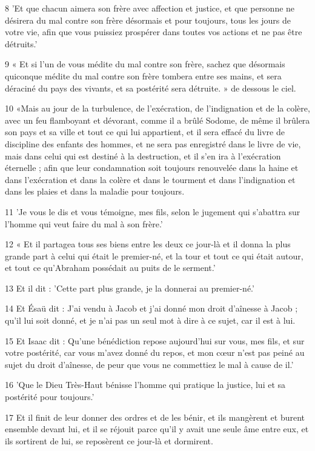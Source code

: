 \par 8 'Et que chacun aimera son frère avec affection et justice, et que personne ne désirera du mal contre son frère désormais et pour toujours, tous les jours de votre vie, afin que vous puissiez prospérer dans toutes vos actions et ne pas être détruits.'
\par 9 « Et si l'un de vous médite du mal contre son frère, sachez que désormais quiconque médite du mal contre son frère tombera entre ses mains, et sera déraciné du pays des vivants, et sa postérité sera détruite. » de dessous le ciel.
\par 10 «Mais au jour de la turbulence, de l'exécration, de l'indignation et de la colère, avec un feu flamboyant et dévorant, comme il a brûlé Sodome, de même il brûlera son pays et sa ville et tout ce qui lui appartient, et il sera effacé du livre de discipline des enfants des hommes, et ne sera pas enregistré dans le livre de vie, mais dans celui qui est destiné à la destruction, et il s'en ira à l'exécration éternelle ; afin que leur condamnation soit toujours renouvelée dans la haine et dans l'exécration et dans la colère et dans le tourment et dans l'indignation et dans les plaies et dans la maladie pour toujours.
\par 11 'Je vous le dis et vous témoigne, mes fils, selon le jugement qui s'abattra sur l'homme qui veut faire du mal à son frère.'
\par 12 « Et il partagea tous ses biens entre les deux ce jour-là et il donna la plus grande part à celui qui était le premier-né, et la tour et tout ce qui était autour, et tout ce qu'Abraham possédait au puits de le serment.'
\par 13 Et il dit : 'Cette part plus grande, je la donnerai au premier-né.'
\par 14 Et Ésaü dit : J'ai vendu à Jacob et j'ai donné mon droit d'aînesse à Jacob ; qu'il lui soit donné, et je n'ai pas un seul mot à dire à ce sujet, car il est à lui.
\par 15 Et Isaac dit : Qu'une bénédiction repose aujourd'hui sur vous, mes fils, et sur votre postérité, car vous m'avez donné du repos, et mon cœur n'est pas peiné au sujet du droit d'aînesse, de peur que vous ne commettiez le mal à cause de il.'
\par 16 'Que le Dieu Très-Haut bénisse l'homme qui pratique la justice, lui et sa postérité pour toujours.'
\par 17 Et il finit de leur donner des ordres et de les bénir, et ils mangèrent et burent ensemble devant lui, et il se réjouit parce qu'il y avait une seule âme entre eux, et ils sortirent de lui, se reposèrent ce jour-là et dormirent.
